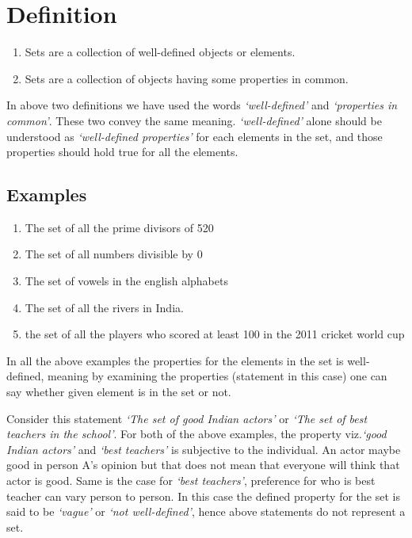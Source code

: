 \documentclass[./main.tex]{subfiles}
\begin{document}
\section*{Definition}
\begin{enumerate}
\item Sets are a collection of well-defined objects or elements.
\item Sets are a collection of objects having some properties in common.
\end{enumerate}
In above two definitions we have used the words \emph{`well-defined'} and \emph{`properties in common'}. These two convey the same meaning. \emph{`well-defined'} alone should be understood as \emph{`well-defined properties'} for each elements in the set, and those properties should hold true for all the elements.


\subsection*{Examples}
\begin{enumerate}
\item The set of all the prime divisors of 520
\item The set of all numbers divisible by 0
\item The set of vowels in the english alphabets
\item The set of all the rivers in India.
\item the set of all the players who scored at least 100 in the 2011 cricket world cup
\end{enumerate}

In all the above examples the properties for the elements in the set is well-defined, meaning by examining the properties (statement in this case) one can say whether given element is in the set or not.

Consider this statement \emph{`The set of good Indian actors'} or \emph{`The set of best teachers in the school'}. For both of the above examples, the property viz.\@ \emph{`good Indian actors'} and \emph{`best teachers'} is subjective to the individual. An actor maybe good in person A's opinion but that does not mean that everyone will think that actor is good. Same is the case for \emph{`best teachers'}, preference for who is best teacher can vary person to person. In this case the defined property for the set is said to be \emph{`vague'} or \emph{`not well-defined'}, hence above statements do not represent a set.
\end{document}
